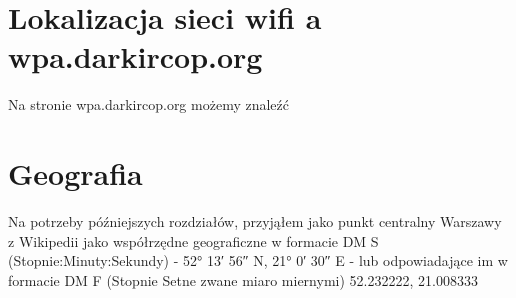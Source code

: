 \section{Lokalizacja sieci wifi a wpa.darkircop.org}
Na stronie wpa.darkircop.org możemy znaleźć 

\section{Geografia}
Na potrzeby późniejszych rozdziałów, przyjąłem jako punkt centralny Warszawy z Wikipedii jako współrzędne geograficzne w formacie DM S (Stopnie:Minuty:Sekundy) - 52° 13′ 56″ N, 21° 0′ 30″ E - lub odpowiadające im w formacie DM F (Stopnie Setne zwane miaro miernymi) 52.232222, 21.008333

